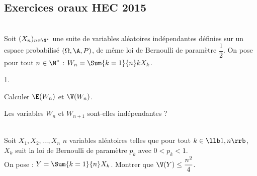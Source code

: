 \subsection*{Exercices oraux HEC 2015}


\begin{exerciceSP}~\\
  Soit $(X_n)_{n\in\N^*}$ une suite de variables aléatoires
  indépendantes définies sur un espace probabilisé $(\Omega,\A,P)$, de
  même loi de Bernoulli de paramètre $\dfrac{1}{2}$. On pose pour tout
  $n\in\N^*$ : $W_n = \Sum{k=1}{n} k X_k$.
  \begin{noliste}{1.}
    \setlength{\itemsep}{2mm}
  \item Calculer $\E(W_n)$ et $\V(W_n)$.
  \item Les variables $W_n$ et $W_{n+1}$ sont-elles indépendantes ?
  \end{noliste}
\end{exerciceSP} 



\begin{exerciceSP}~\\
  Soit $X_1,X_2,\hdots,X_n$ $n$ variables aléatoires telles que pour
  tout $k\in\llb 1,n\rrb$, $X_k$ suit la loi de Bernoulli de paramètre
  $p_k$ avec $0 < p_k < 1$.\\
  On pose : $Y = \Sum{k=1}{n} X_k$. Montrer que $\V(Y)\leq
  \dfrac{n^2}{4}$.
\end{exerciceSP} 



